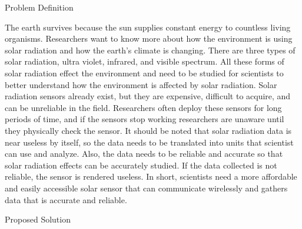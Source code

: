 \documentclass[10pt,draftclsnofoot,onecolumn,letterpaper]{article}
\begin{document}
    \newpage
        
    \vspace{\baselineskip}\begin{Center}
    {\fontsize{14pt}{16.8pt}\selectfont Problem Definition\par}
    \end{Center}\par
        
    {\fontsize{10pt}{12.0pt}\selectfont The earth survives because the sun supplies constant energy to countless living organisms. Researchers want to know more about how the environment is using solar radiation and how the earth’s climate is changing. There are three types of solar radiation, ultra violet, infrared, and visible spectrum. All these forms of solar radiation effect the environment and need to be studied for scientists to better understand how the environment is affected by solar radiation. Solar radiation sensors already exist, but they are expensive, difficult to acquire, and can be unreliable in the field. Researchers often deploy these sensors for long periods of time, and if the sensors stop working researchers are unaware until they physically check the sensor. It should be noted that solar radiation data is near useless by itself, so the data needs to be translated into units that scientist can use and analyze. Also, the data needs to be reliable and accurate so that solar radiation effects can be accurately studied. If the data collected is not reliable, the sensor is rendered useless. In short, scientists need a more affordable and easily accessible solar sensor that can communicate wirelessly and gathers data that is accurate and reliable. \par}\par
        
    \begin{Center}
    {\fontsize{14pt}{16.8pt}\selectfont Proposed Solution\par}
    \end{Center}\par
        
\end{document}
